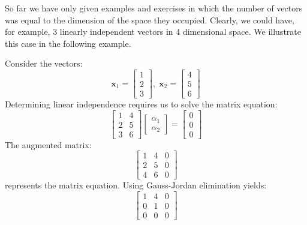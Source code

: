 \begin{remark} So far we have only given examples and exercises in which the number of vectors was equal to the dimension of the space they occupied. Clearly, we could have, for example, 3 linearly independent vectors in 4 dimensional space. We illustrate this case in the following example.
\end{remark}

\begin{example} Consider the vectors:
\begin{displaymath}
\mathbf{x}_1 = \begin{bmatrix}
1\\2\\3
\end{bmatrix},\;
\mathbf{x}_2 = \begin{bmatrix}
4\\5\\6
\end{bmatrix}
\end{displaymath}
Determining linear independence requires us to solve the matrix equation:
\begin{displaymath}
\begin{bmatrix}
1 & 4\\
2 & 5\\
3 & 6
\end{bmatrix}
\begin{bmatrix}
\alpha_1\\
\alpha_2
\end{bmatrix} = 
\begin{bmatrix}
0\\
0\\
0
\end{bmatrix}
\end{displaymath}
The augmented matrix:
\begin{displaymath}
\left[
\begin{array}{cc|c}
1 & 4 & 0\\
2 & 5 & 0\\
4 & 6 & 0
\end{array}\right]
\end{displaymath}
represents the matrix equation. Using Gauss-Jordan elimination yields:
\begin{displaymath}
\left[
\begin{array}{cc|c}
1 & 4 & 0\\
0 & 1 & 0\\
0 & 0 & 0
\end{array}\right]
\end{displaymath}

\end{example}
